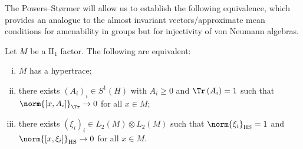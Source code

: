 \documentclass[10pt]{mypackage}
\begin{document}
The Powers--Størmer will allow us to establish the following equivalence, which provides an analogue to the almost invariant vectors/approximate mean conditions for amenability in groups but for injectivity of von Neumann algebras.
\begin{theorem}
  Let $M$ be a $\text{II}_1$ factor. The following are equivalent:
  \begin{enumerate}[(i)]
    \item $M$ has a hypertrace;
    \item there exists $\left( A_i \right)_i\in S^1\left( H \right)$ with $A_i\geq 0$ and $\Tr\left( A_i \right) = 1$ such that $\norm{\left[ x,A_i \right]}_{\Tr}\rightarrow 0$ for all $x\in M$;
    \item there exists $\left( \xi_i \right)_i\in L_2\left( M \right)\otimes L_2\left( M \right)$ such that $\norm{\xi_i}_{\operatorname{HS}} = 1$ and $\norm{\left[ x,\xi_i \right]}_{\operatorname{HS}}\rightarrow 0$ for all $x\in M$.
  \end{enumerate}
\end{theorem}
\end{document}

